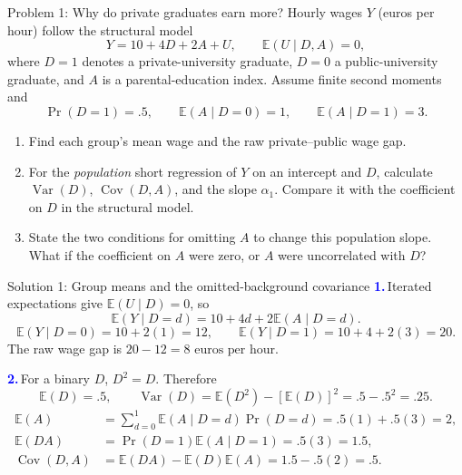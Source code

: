 \documentclass[notes,10pt, aspectratio=169]{beamer}
\newif\ifshowsolutions
\newcommand{\E}{\mathbb{E}}
\newcommand{\Var}{\operatorname{Var}}
\newcommand{\Cov}{\operatorname{Cov}}
\newcommand{\answerpart}[1]{\textcolor{blue}{\textbf{#1.}}\,}
\begin{document}
\begin{frame}{Problem 1: Why do private graduates earn more?}
Hourly wages $Y$ (euros per hour) follow the structural model
\[
Y=10+4D+2A+U,\qquad \E(U\mid D,A)=0,
\]
where $D=1$ denotes a private-university graduate, $D=0$ a public-university graduate, and $A$ is a parental-education index. Assume finite second moments and
\[
\Pr(D=1)=.5,\qquad \E(A\mid D=0)=1,\qquad \E(A\mid D=1)=3.
\]
\begin{enumerate}
\setlength{\itemsep}{7pt}
\item Find each group's mean wage and the raw private--public wage gap.
\item For the \emph{population} short regression of $Y$ on an intercept and $D$, calculate $\Var(D)$, $\Cov(D,A)$, and the slope $\alpha_1$. Compare it with the coefficient on $D$ in the structural model.
\item State the two conditions for omitting $A$ to change this population slope. What if the coefficient on $A$ were zero, or $A$ were uncorrelated with $D$?
\end{enumerate}
\end{frame}

\ifshowsolutions
\begin{frame}{Solution 1: Group means and the omitted-background covariance}
\small
\answerpart{1}Iterated expectations give $\E(U\mid D)=0$, so
\[
\E(Y\mid D=d)=10+4d+2\E(A\mid D=d).
\]
\[
\E(Y\mid D=0)=10+2(1)=12,\qquad
\E(Y\mid D=1)=10+4+2(3)=20.
\]
The raw wage gap is $20-12=\boxed{8\text{ euros per hour}}$.
\par\vspace{6pt}
\answerpart{2}For a binary $D$, $D^2=D$. Therefore
\[
\E(D)=.5,\qquad \Var(D)=\E(D^2)-[\E(D)]^2=.5-.5^2=\boxed{.25}.
\]
\begin{align*}
\E(A)&=\sum_{d=0}^1\E(A\mid D=d)\Pr(D=d)=.5(1)+.5(3)=2,\\
\E(DA)&=\Pr(D=1)\E(A\mid D=1)=.5(3)=1.5,\\
\Cov(D,A)&=\E(DA)-\E(D)\E(A)=1.5-.5(2)=\boxed{.5}.
\end{align*}
\end{frame}
\end{document}

